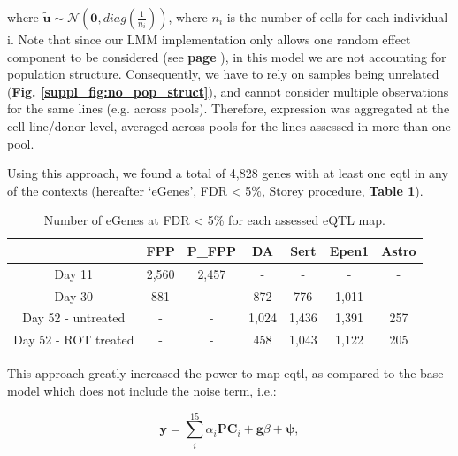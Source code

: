 where $\tilde{\mathbf{u}} \sim \mathcal{N}(\mathbf{0}, diag(\frac{1}{n_i}))$, where $n_i$ is the number of cells for each individual i.
Note that since our LMM implementation only allows one random effect component to be considered (see\textbf{ page \pageref{sec:non_gaussian}}), in this model we are not accounting for population structure.
Consequently, we have to rely on samples being unrelated (\textbf{Fig. \ref{suppl_fig:no_pop_struct}}), and cannot consider multiple observations for the same lines (e.g. across pools). 
Therefore, expression was aggregated at the cell line/donor level, averaged across pools for the lines assessed in more than one pool. 

\newpage

Using this approach, we found
a total of 4,828 genes with at least one \gls{eqtl} in any of the contexts (hereafter `eGenes', FDR < 5\%, Storey procedure, \textbf{Table \ref{tab:eqtl_results}}).

\begin{table}[h]
    \centering
    \begin{tabular}{c|c c c c c c}
    &         FPP & P\_FPP & DA & Sert & Epen1 & Astro \\
    \hline
    Day 11  & 2,560 & 2,457 & - & - & - & - \\
    Day 30  & 881 & - &  872 & 776 & 1,011 & -  \\
    Day 52 - untreated & - & - & 1,024 & 1,436 & 1,391 & 257 \\
    Day 52 - ROT treated & - & -  & 458 & 1,043 & 1,122 & 205 \\
    \end{tabular}
    \caption{Number of eGenes at FDR < 5\% for each assessed eQTL map.}
    \label{tab:eqtl_results}
\end{table}


This approach greatly increased the power to map \gls{eqtl},
as compared to the base-model which does not include the noise term, i.e.:

\begin{equation}\label{eq:neuroseq_base}
    \mathbf{y} = \sum_i^{15}\alpha_i \mathbf{PC}_i + \mathbf{g}\beta + \boldsymbol{\psi},
\end{equation}

